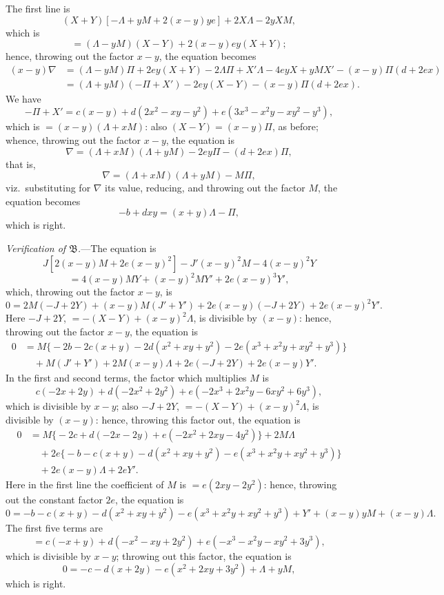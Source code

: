 \documentclass[11pt]{article}
\begin{document}
The first line is
\[
(X + Y)[-\Lambda + yM + 2(x - y)ye] + 2X\Lambda - 2yXM,
\]
which is
\[
= (\Lambda - yM)(X - Y) + 2(x - y)ey(X + Y);
\]
hence, throwing out the factor $x - y$, the equation becomes
\begin{align*}
(x - y)\nabla &= (\Lambda - yM)\Pi + 2ey(X + Y) - 2\Lambda\Pi + X'\Lambda - 4eyX + yMX' - (x - y)\Pi(d + 2ex)\\
&= (\Lambda + yM)(-\Pi + X') - 2ey(X - Y) - (x - y)\Pi(d + 2ex).
\end{align*}
We have
\[
-\Pi + X' = c(x - y) + d(2x^2 - xy - y^2) + e(3x^3 - x^2 y - xy^2 - y^3),
\]
which is $=(x - y)(\Lambda + xM)$: also $(X - Y) = (x - y)\Pi$, as before; whence, throwing out the factor $x - y$, the equation is
\[
\nabla = (\Lambda + xM)(\Lambda + yM) - 2ey\Pi - (d + 2ex)\Pi,
\]
that is,
\[
\nabla = (\Lambda + xM)(\Lambda + yM) - M\Pi,
\]
viz.\ substituting for $\nabla$ its value, reducing, and throwing out the factor $M$, the equation becomes
\[
-b + dxy = (x + y)\Lambda - \Pi,
\]
which is right.

\medskip
\noindent\textit{Verification of $\mathfrak{B}$.}---The equation is
\[
J[2(x - y)M + 2e(x - y)^2] - J'(x - y)^2 M - 4(x - y)^2 Y
\]
\[
= 4(x - y)MY + (x - y)^2 MY' + 2e(x - y)^3 Y',
\]
which, throwing out the factor $x - y$, is
\[
0 = 2M(-J + 2Y) + (x - y)M(J' + Y') + 2e(x - y)(-J + 2Y) + 2e(x - y)^2 Y'.
\]
Here $-J + 2Y$, $= -(X - Y) + (x - y)^2\Lambda$, is divisible by $(x - y)$: hence, throwing out the factor $x - y$, the equation is
\begin{align*}
0 &= M\bigl\{-2b - 2c(x + y) - 2d(x^2 + xy + y^2) - 2e(x^3 + x^2 y + xy^2 + y^3)\bigr\}\\
&\quad + M(J' + Y') + 2M(x - y)\Lambda + 2e(-J + 2Y) + 2e(x - y)Y'.
\end{align*}
In the first and second terms, the factor which multiplies $M$ is
\[
c(-2x + 2y) + d(-2x^2 + 2y^2) + e(-2x^3 + 2x^2 y - 6xy^2 + 6y^3),
\]
which is divisible by $x - y$; also $-J + 2Y$, $= -(X - Y) + (x - y)^2\Lambda$, is divisible by $(x - y)$: hence, throwing this factor out, the equation is
\begin{align*}
0 &= M\bigl\{-2c + d(-2x - 2y) + e(-2x^2 + 2xy - 4y^2)\bigr\} + 2M\Lambda\\
&\quad + 2e\bigl\{-b - c(x + y) - d(x^2 + xy + y^2) - e(x^3 + x^2 y + xy^2 + y^3)\bigr\}\\
&\quad + 2e(x - y)\Lambda + 2eY'.
\end{align*}
Here in the first line the coefficient of $M$ is $= e(2xy - 2y^2)$: hence, throwing out the constant factor $2e$, the equation is
\[
0 = -b - c(x + y) - d(x^2 + xy + y^2) - e(x^3 + x^2 y + xy^2 + y^3) + Y' + (x - y)yM + (x - y)\Lambda.
\]
The first five terms are
\[
= c(-x + y) + d(-x^2 - xy + 2y^2) + e(-x^3 - x^2 y - xy^2 + 3y^3),
\]
which is divisible by $x - y$; throwing out this factor, the equation is
\[
0 = -c - d(x + 2y) - e(x^2 + 2xy + 3y^2) + \Lambda + yM,
\]
which is right.
\end{document}
